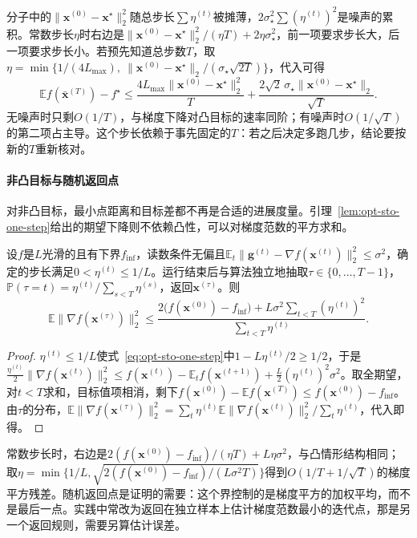 分子中的$\lVert\bm x^{(0)}-\bm x^\star\rVert_2^2$随总步长$\sum\eta^{(t)}$被摊薄，$2\sigma_\star^2\sum(\eta^{(t)})^2$是噪声的累积。常数步长$\eta$时右边是$\lVert\bm x^{(0)}-\bm x^\star\rVert_2^2/(\eta T)+2\eta\sigma_\star^2$，前一项要求步长大，后一项要求步长小。若预先知道总步数$T$，取$\eta=\min\{1/(4L_{\max}),\ \lVert\bm x^{(0)}-\bm x^\star\rVert_2/(\sigma_\star\sqrt{2T})\}$，代入可得
\[
  \mathbb E f(\bar{\bm x}^{(T)})-f^\star\leq\frac{4L_{\max}\lVert\bm x^{(0)}-\bm x^\star\rVert_2^2}{T}+\frac{2\sqrt2\,\sigma_\star\lVert\bm x^{(0)}-\bm x^\star\rVert_2}{\sqrt T}.
\]
无噪声时只剩$O(1/T)$，与梯度下降对凸目标的速率同阶；有噪声时$O(1/\sqrt T)$的第二项占主导。这个步长依赖于事先固定的$T$：若之后决定多跑几步，结论要按新的$T$重新核对。

\paragraph{非凸目标与随机返回点}
对非凸目标，最小点距离和目标差都不再是合适的进展度量。引理~\ref{lem:opt-sto-one-step}给出的期望下降则不依赖凸性，可以对梯度范数的平方求和。

\begin{theorem}[非凸光滑目标的随机返回点]
\label{thm:opt-sto-nonconvex}
设$f$是$L$光滑的且有下界$f_{\inf}$，读数条件无偏且$\mathbb E_t\lVert\bm g^{(t)}-\nabla f(\bm x^{(t)})\rVert_2^2\leq\sigma^2$，确定的步长满足$0<\eta^{(t)}\leq1/L$。运行结束后与算法独立地抽取$\tau\in\{0,\dots,T-1\}$，$\mathbb P(\tau=t)=\eta^{(t)}/\sum_{s<T}\eta^{(s)}$，返回$\bm x^{(\tau)}$。则
\begin{equation}
\label{eq:opt-sto-nonconvex}
  \mathbb E\lVert\nabla f(\bm x^{(\tau)})\rVert_2^2\leq\frac{2\bigl(f(\bm x^{(0)})-f_{\inf}\bigr)+L\sigma^2\sum_{t<T}(\eta^{(t)})^2}{\sum_{t<T}\eta^{(t)}} .
\end{equation}
\end{theorem}

\begin{proof}
$\eta^{(t)}\leq1/L$使式~\eqref{eq:opt-sto-one-step}中$1-L\eta^{(t)}/2\geq1/2$，于是$\tfrac{\eta^{(t)}}2\lVert\nabla f(\bm x^{(t)})\rVert_2^2\leq f(\bm x^{(t)})-\mathbb E_tf(\bm x^{(t+1)})+\tfrac L2(\eta^{(t)})^2\sigma^2$。取全期望，对$t<T$求和，目标值项相消，剩下$f(\bm x^{(0)})-\mathbb Ef(\bm x^{(T)})\leq f(\bm x^{(0)})-f_{\inf}$。由$\tau$的分布，$\mathbb E\lVert\nabla f(\bm x^{(\tau)})\rVert_2^2=\sum_t\eta^{(t)}\mathbb E\lVert\nabla f(\bm x^{(t)})\rVert_2^2/\sum_t\eta^{(t)}$，代入即得。
\end{proof}

常数步长时，右边是$2(f(\bm x^{(0)})-f_{\inf})/(\eta T)+L\eta\sigma^2$，与凸情形结构相同；取$\eta=\min\{1/L,\sqrt{2(f(\bm x^{(0)})-f_{\inf})/(L\sigma^2T)}\}$得到$O(1/T+1/\sqrt T)$的梯度平方残差。随机返回点是证明的需要：这个界控制的是梯度平方的加权平均，而不是最后一点。实践中常改为返回在独立样本上估计梯度范数最小的迭代点，那是另一个返回规则，需要另算估计误差。

